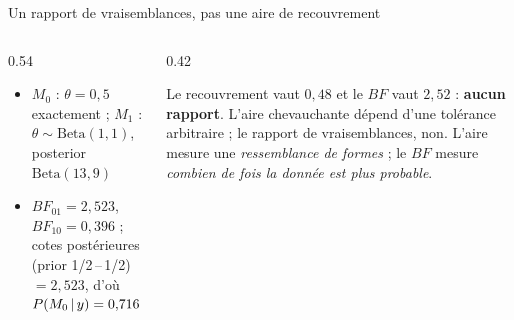 \begin{frame}{Un rapport de vraisemblances, pas une aire de recouvrement}

\vspace{-1mm}
\begin{columns}[t]
\begin{column}{0.54\textwidth}
\begin{ebox}
\begin{itemize}
  \item $M_0$ : $\theta = 0{,}5$ exactement ; $M_1$ : $\theta \sim \mathrm{Beta}(1,1)$,
        posterior $\mathrm{Beta}(13,9)$
  \item $BF_{01} = 2{,}523$, $BF_{10} = 0{,}396$ ; cotes postérieures
        (prior 1/2\,--\,1/2) $= 2{,}523$, d'où $P(M_0 \,\vert\, y) = 0{,}716$
\end{itemize}
\end{ebox}
\end{column}
\begin{column}{0.42\textwidth}
\begin{wbox}
Le recouvrement vaut $0{,}48$ et le $BF$ vaut $2{,}52$ : \textbf{aucun rapport}.
L'aire chevauchante dépend d'une tolérance arbitraire ; le rapport de vraisemblances, non.
{\footnotesize L'aire mesure une \emph{ressemblance de formes} ; le $BF$ mesure
\emph{combien de fois la donnée est plus probable}.}
\end{wbox}
\end{column}
\end{columns}
\end{frame}

